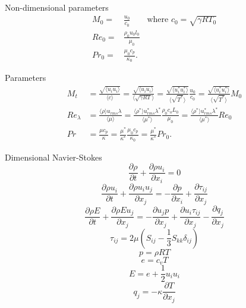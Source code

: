 \documentclass[oneside,a4paper,11pt]{report}
\begin{document}
Non-dimensional parameters
\begin{align}
    M_0 =& \frac{u_0}{c_0} \qquad \text{where } c_0 = \sqrt{\gamma R T_0} \\
    Re_0 =& \frac{\rho_0 u_0 l_0}{\mu_0}\\
    Pr_0 =& \frac{\mu_0 c_p}{\kappa_0}.
\end{align}

Parameters
\begin{align}
    M_t &= \frac{\sqrt{\langle u_i u_i \rangle}}{ \langle c \rangle} = \frac{\sqrt{\langle u_i u_i \rangle}}{ \langle \sqrt{\gamma R T} \rangle} = \frac{\sqrt{\langle u^*_i u^*_i \rangle}}{ \langle \sqrt{T^*} \rangle} \frac{u_0}{c_0} = \frac{\sqrt{\langle u^*_i u^*_i \rangle}}{ \langle \sqrt{T^*} \rangle} M_0 \\
    Re_\lambda &= \frac{\langle \rho \rangle u_{rms} \lambda }{\langle \mu \rangle} = \frac{\langle \rho^* \rangle u^*_{rms} \lambda^* }{\langle \mu^* \rangle} \frac{\rho_0 c_o L_0}{\mu_0} = \frac{\langle \rho^* \rangle u^*_{rms} \lambda^* }{\langle \mu^* \rangle} Re_0 \\
    Pr &= \frac{\mu c_p}{\kappa} = \frac{\mu^*}{\kappa^*} \frac{\mu_0 c_p}{\kappa_0} = \frac{\mu^*}{\kappa^*} Pr_0.
\end{align}

\newpage
Dimensional Navier-Stokes
\begin{equation}
\frac{\partial \rho}{\partial t} + \frac{\partial \rho u_i}{\partial x_i} = 0
\end{equation}
\begin{equation}
\frac{\partial \rho u_i}{\partial t} + \frac{\partial \rho u_i u_j}{\partial x_j} = -\frac{\partial p}{\partial x_i} + \frac{\partial \tau_{ij}}{\partial x_j}
\end{equation}
\begin{equation}
\frac{\partial \rho E}{\partial t} + \frac{\partial \rho E u_j}{\partial x_j} = -\frac{\partial u_j p}{\partial x_j} + \frac{\partial u_i \tau_{ij}}{\partial x_j} - \frac{\partial q_j}{\partial x_j}
\end{equation}
\begin{equation}
\tau_{ij} = 2 \mu \left (S_{ij} - \frac{1}{3} S_{kk} \delta_{ij} \right )
\end{equation}
\begin{equation}
p = \rho R T
\end{equation}
\begin{equation}
e = c_v T
\end{equation}
\begin{equation}
E = e + \frac{1}{2} u_i u_i
\end{equation}
\begin{equation}
q_j = -\kappa \frac{\partial T}{\partial x_j}
\end{equation}
\end{document}
